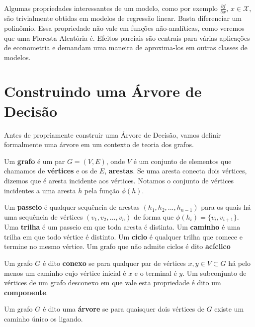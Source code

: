 Algumas propriedades interessantes de um modelo, como por exemplo $\frac{\partial f}{\partial x}, \, x \in \mathcal{X}$, são trivialmente obtidas em modelos de regressão linear. Basta diferenciar um polinômio. Essa propriedade não vale em funções não-analíticas, como veremos que uma Floresta Aleatória é. Efeitos parciais são centrais para várias aplicações de econometria e demandam uma maneira de aproxima-los em outras classes de modelos.

\section{Construindo uma Árvore de Decisão}

Antes de propriamente construir uma Árvore de Decisão, vamos definir formalmente uma árvore em um contexto de teoria dos grafos. 

\begin{defi}
Um \textbf{grafo} é um par $G = (V, E)$, onde $V$ é um conjunto de elementos que chamamos de \textbf{vértices} e os de $E$, \textbf{arestas}. Se uma aresta conecta dois vértices, dizemos que é aresta incidente aos vértices. Notamos o conjunto de vértices incidentes a uma aresta $h$ pela função $\phi(h)$.
\end{defi}

\begin{defi}
Um \textbf{passeio} é qualquer sequência de arestas $(h_1, h_2, ..., h_{n-1})$ para os quais há uma sequência de vértices $(v_1, v_2, ..., v_n)$ de forma que $\phi(h_i) = \{v_i, v_{i+1}\}$. Uma \textbf{trilha} é um passeio em que toda aresta é distinta. Um \textbf{caminho} é uma trilha em que todo vértice é distinto. Um \textbf{ciclo} é qualquer trilha que comece e termine no mesmo vértice. Um grafo que não admite ciclos é dito \textbf{acíclico}
\end{defi}

\begin{defi}
Um grafo $G$ é dito \textbf{conexo} se para qualquer par de vértices $x, y \in V \subset G$ há pelo menos um caminho cujo vértice inicial é $x$ e o terminal é $y$. Um subconjunto de vértices de um grafo desconexo em que vale esta propriedade é dito um \textbf{componente}.
\end{defi}


\begin{defi}
Um grafo $G$ é dito uma \textbf{árvore} se para quaisquer dois vértices de $G$ existe um caminho único os ligando.
\end{defi}

